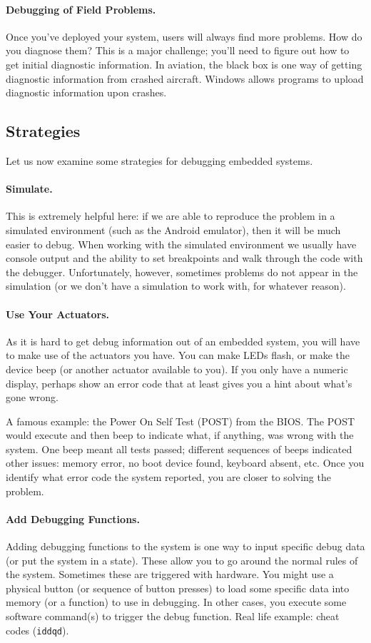 \paragraph{Debugging of Field Problems.} Once you've deployed your
system, users will always find more problems. How do you diagnose
them?  This is a major challenge; you'll need to figure out how to get
initial diagnostic information. In aviation, the black box is one way
of getting diagnostic information from crashed aircraft. Windows
allows programs to upload diagnostic information upon crashes.


\subsection*{Strategies}
Let us now examine some strategies for debugging embedded systems.
 
\paragraph{Simulate.}
This is extremely helpful here: if we are able to reproduce the problem in a simulated environment (such as the Android emulator), then it will be much easier to debug. When working with the simulated environment we usually have console output and the ability to set breakpoints and walk through the code with the debugger. Unfortunately, however, sometimes problems do not appear in the simulation (or we don't have a simulation to work with, for whatever reason).
 
\paragraph{Use Your Actuators.}
As it is hard to get debug information out of an embedded system, you will have to make use of the actuators you have. You can make LEDs flash, or make the device beep (or another actuator available to you). If you only have a numeric display, perhaps show an error code that at least gives you a hint about what's gone wrong.

A famous example: the Power On Self Test (POST) from the BIOS. The POST would execute and then beep to indicate what, if anything, was wrong with the system. One beep meant all tests passed; different sequences of beeps indicated other issues: memory error, no boot device found, keyboard absent, etc. Once you identify what error code the system reported, you are closer to solving the problem.

\paragraph{Add Debugging Functions.}
Adding debugging functions to the system is one way to input specific debug data (or put the system in a state). These allow you to go around the normal rules of the system. Sometimes these are triggered with hardware. You might use a physical button (or sequence of button presses) to load some specific data into memory (or a function) to use in debugging. In other cases, you execute some software command(s) to trigger the debug function. Real life example: cheat codes (\texttt{iddqd}).

